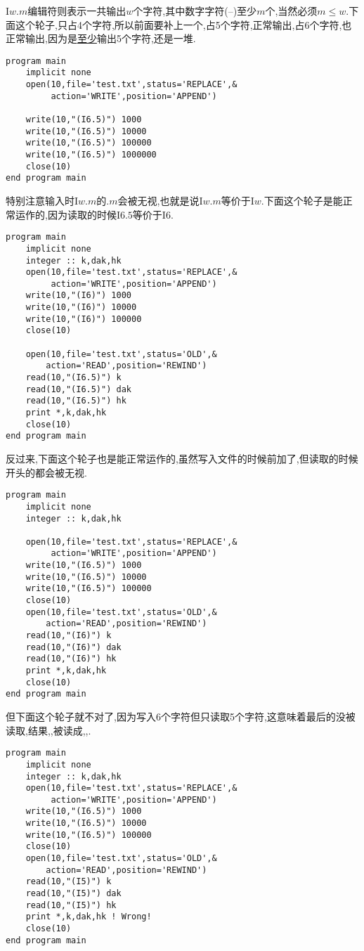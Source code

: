 I$w.m$编辑符则表示一共输出$w$个字符,其中数字字符(--)至少$m$个,当然必须$m\leqslant  w$.下面这个轮子,只占4个字符,所以前面要补上一个,占5个字符,正常输出,占6个字符,也正常输出,因为是\uline{至少}输出5个字符,还是一堆\ttt{*}.
\begin{lstlisting}
program main
    implicit none
    open(10,file='test.txt',status='REPLACE',&
         action='WRITE',position='APPEND')

    write(10,"(I6.5)") 1000
    write(10,"(I6.5)") 10000
    write(10,"(I6.5)") 100000
    write(10,"(I6.5)") 1000000
    close(10)
end program main
\end{lstlisting}
特别注意输入时I$w.m$的$.m$会被无视,也就是说I$w.m$等价于I$w$.下面这个轮子是能正常运作的,因为读取的时候I$6.5$等价于I$6$.
\begin{lstlisting}
program main
    implicit none
    integer :: k,dak,hk
    open(10,file='test.txt',status='REPLACE',&
         action='WRITE',position='APPEND')
    write(10,"(I6)") 1000
    write(10,"(I6)") 10000
    write(10,"(I6)") 100000
    close(10)

    open(10,file='test.txt',status='OLD',&
        action='READ',position='REWIND')
    read(10,"(I6.5)") k
    read(10,"(I6.5)") dak
    read(10,"(I6.5)") hk
    print *,k,dak,hk
    close(10)
end program main
\end{lstlisting}
反过来,下面这个轮子也是能正常运作的,虽然写入文件的时候前加了,但读取的时候开头的都会被无视.
\begin{lstlisting}
program main
    implicit none
    integer :: k,dak,hk

    open(10,file='test.txt',status='REPLACE',&
         action='WRITE',position='APPEND')
    write(10,"(I6.5)") 1000
    write(10,"(I6.5)") 10000
    write(10,"(I6.5)") 100000
    close(10)
    open(10,file='test.txt',status='OLD',&
        action='READ',position='REWIND')
    read(10,"(I6)") k
    read(10,"(I6)") dak
    read(10,"(I6)") hk
    print *,k,dak,hk
    close(10)
end program main
\end{lstlisting}
但下面这个轮子就不对了,因为写入6个字符但只读取5个字符,这意味着最后的没被读取,结果,,被读成,,.
\begin{lstlisting}
program main
    implicit none
    integer :: k,dak,hk
    open(10,file='test.txt',status='REPLACE',&
         action='WRITE',position='APPEND')
    write(10,"(I6.5)") 1000
    write(10,"(I6.5)") 10000
    write(10,"(I6.5)") 100000
    close(10)
    open(10,file='test.txt',status='OLD',&
        action='READ',position='REWIND')
    read(10,"(I5)") k
    read(10,"(I5)") dak
    read(10,"(I5)") hk
    print *,k,dak,hk ! Wrong!
    close(10)
end program main
\end{lstlisting}

